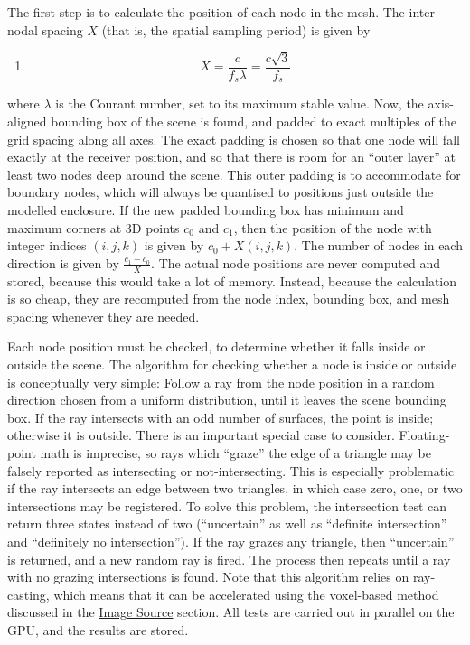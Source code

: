 \documentclass[]{scrreprt}
\providecommand{\tightlist}{%
  \setlength{\itemsep}{0pt}\setlength{\parskip}{0pt}}
\begin{document}
The first step is to calculate the position of each node in the mesh.
The inter-nodal spacing \(X\) (that is, the spatial sampling period) is
given by

\begin{enumerate}
\def\labelenumi{(\arabic{enumi})}
\setcounter{enumi}{23}
\tightlist
\item
  \[X=\frac{c}{f_s\lambda} = \frac{c\sqrt{3}}{f_s}\]
\end{enumerate}

where \(\lambda\) is the Courant number, set to its maximum stable
value. Now, the axis-aligned bounding box of the scene is found, and
padded to exact multiples of the grid spacing along all axes. The exact
padding is chosen so that one node will fall exactly at the receiver
position, and so that there is room for an ``outer layer'' at least two
nodes deep around the scene. This outer padding is to accommodate for
boundary nodes, which will always be quantised to positions just outside
the modelled enclosure. If the new padded bounding box has minimum and
maximum corners at 3D points \(c_0\) and \(c_1\), then the position of
the node with integer indices \((i, j, k)\) is given by
\(c_0 + X(i, j, k)\). The number of nodes in each direction is given by
\(\frac{c_1 - c_0}{X}\). The actual node positions are never computed
and stored, because this would take a lot of memory. Instead, because
the calculation is so cheap, they are recomputed from the node index,
bounding box, and mesh spacing whenever they are needed.

Each node position must be checked, to determine whether it falls inside
or outside the scene. The algorithm for checking whether a node is
inside or outside is conceptually very simple: Follow a ray from the
node position in a random direction chosen from a uniform distribution,
until it leaves the scene bounding box. If the ray intersects with an
odd number of surfaces, the point is inside; otherwise it is outside.
There is an important special case to consider. Floating-point math is
imprecise, so rays which ``graze'' the edge of a triangle may be falsely
reported as intersecting or not-intersecting. This is especially
problematic if the ray intersects an edge between two triangles, in
which case zero, one, or two intersections may be registered. To solve
this problem, the intersection test can return three states instead of
two (``uncertain'' as well as ``definite intersection'' and ``definitely
no intersection''). If the ray grazes any triangle, then ``uncertain''
is returned, and a new random ray is fired. The process then repeats
until a ray with no grazing intersections is found. Note that this
algorithm relies on ray-casting, which means that it can be accelerated
using the voxel-based method discussed in the
\href{\%7B\%7B\%20site.baseurl\%20\%7D\%7D\%7B\%\%20link\%20image_source.md\%20\%\%7D}{Image
Source} section. All tests are carried out in parallel on the GPU, and
the results are stored.
\end{document}
